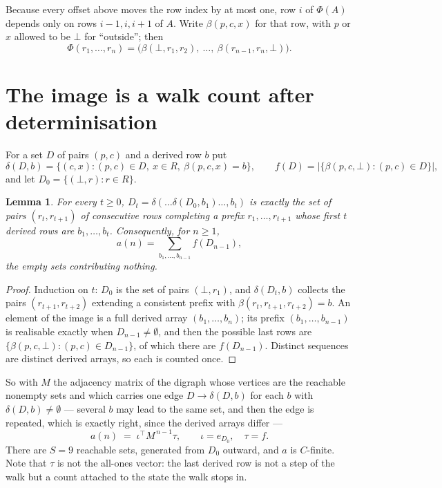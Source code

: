 \documentclass[11pt,a4paper]{article}
\theoremstyle{plain}
\newtheorem{lemma}[theorem]{Lemma}
\theoremstyle{definition}
\begin{document}
Because every offset above moves the row index by at most one, row $i$ of
$\Phi(A)$ depends only on rows $i-1,i,i+1$ of $A$. Write $\beta(p,c,x)$ for that row, with $p$
or $x$ allowed to be $\bot$ for ``outside''; then
\[
\Phi(r_1,\dots,r_n)=\bigl(\beta(\bot,r_1,r_2),\ \dots,\ \beta(r_{n-1},r_n,\bot)\bigr).
\]

\section{The image is a walk count after determinisation}

For a set $D$ of pairs $(p,c)$ and a derived row $b$ put
\[
\delta(D,b)=\{(c,x):(p,c)\in D,\ x\in R,\ \beta(p,c,x)=b\},\qquad
f(D)=\bigl|\{\beta(p,c,\bot):(p,c)\in D\}\bigr| ,
\]
and let $D_0=\{(\bot,r):r\in R\}$.

\begin{lemma}\label{lem:det}
For every $t\ge0$, $D_t=\delta(\dots\delta(D_0,b_1)\dots,b_t)$ is exactly the set of pairs
$(r_t,r_{t+1})$ of consecutive rows completing a prefix $r_1,\dots,r_{t+1}$ whose first $t$
derived rows are $b_1,\dots,b_t$. Consequently, for $n\ge1$,
\[
a(n)=\sum_{b_1,\dots,b_{n-1}}f(D_{n-1}),
\]
the empty sets contributing nothing.
\end{lemma}

\begin{proof}
Induction on $t$: $D_0$ is the set of pairs $(\bot,r_1)$, and $\delta(D_t,b)$ collects the
pairs $(r_{t+1},r_{t+2})$ extending a consistent prefix with
$\beta(r_t,r_{t+1},r_{t+2})=b$. An element of the image is a full derived array
$(b_1,\dots,b_n)$; its prefix $(b_1,\dots,b_{n-1})$ is realisable exactly when
$D_{n-1}\neq\emptyset$, and then the possible last rows are
$\{\beta(p,c,\bot):(p,c)\in D_{n-1}\}$, of which there are $f(D_{n-1})$. Distinct sequences
are distinct derived arrays, so each is counted once.
\end{proof}

So with $M$ the adjacency matrix of the digraph whose vertices are the reachable nonempty sets
and which carries one edge $D\to\delta(D,b)$ for each $b$ with $\delta(D,b)\neq\emptyset$ ---
several $b$ may lead to the same set, and then the edge is repeated, which is exactly right,
since the derived arrays differ ---
\[
a(n)\;=\;\iota^{\!\top}M^{\,n-1}\tau,\qquad \iota=e_{D_0},\quad \tau=f .
\]
There are $S=9$ reachable sets, generated from $D_0$ outward, and $a$ is $C$-finite.
Note that $\tau$ is not the all-ones vector: the last derived row is not a
step of the walk but a count attached to the state the walk stops in.
\end{document}
